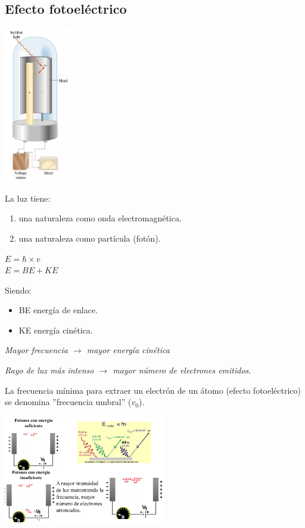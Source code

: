     \subsection{Efecto fotoeléctrico}
        \begin{center} \includegraphics[width=3cm]{./imagenes/efectoFotoelectrico.png} \end{center}
        \indent La luz tiene:
        \begin{enumerate} 
            \item una naturaleza como onda electromagnética.
            \item una naturaleza como partícula (fotón).
        \end{enumerate}
        \begin{center} 
            $E = \hbar \times v$ \\
            $E = BE + KE$
        \end{center}
        \indent Siendo:
        \begin{itemize}
            \item BE\: energía de enlace.
            \item KE\: energía cinética.
        \end{itemize}
        \begin{center} \textit{Mayor frecuencia $\rightarrow$ mayor energía cinética} \end{center}
        \begin{center} \textit{Rayo de luz más intenso $\rightarrow$ mayor número de electrones emitidos.} \end{center}
        \indent La frecuencia mínima para extraer un electrón de un átomo (efecto fotoeléctrico) se denomina ''frecuencia umbral'' ($v_0$).
        \begin{center} \includegraphics[width=7cm]{./imagenes/frecuenciaUmbral.png} \end{center}

